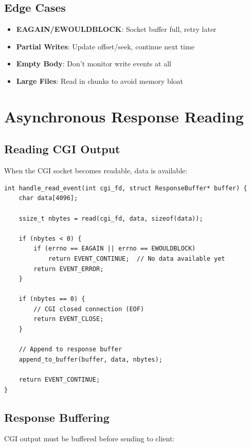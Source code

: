 \documentclass[12pt,a4paper]{article}
\begin{document}
\subsection{Edge Cases}

\begin{itemize}
    \item \textbf{EAGAIN/EWOULDBLOCK}: Socket buffer full, retry later
    \item \textbf{Partial Writes}: Update offset/seek, continue next time
    \item \textbf{Empty Body}: Don't monitor write events at all
    \item \textbf{Large Files}: Read in chunks to avoid memory bloat
\end{itemize}

\section{Asynchronous Response Reading}

\subsection{Reading CGI Output}

When the CGI socket becomes readable, data is available:

\begin{lstlisting}[caption=Non-Blocking Read]
int handle_read_event(int cgi_fd, struct ResponseBuffer* buffer) {
    char data[4096];
    
    ssize_t nbytes = read(cgi_fd, data, sizeof(data));
    
    if (nbytes < 0) {
        if (errno == EAGAIN || errno == EWOULDBLOCK)
            return EVENT_CONTINUE;  // No data available yet
        return EVENT_ERROR;
    }
    
    if (nbytes == 0) {
        // CGI closed connection (EOF)
        return EVENT_CLOSE;
    }
    
    // Append to response buffer
    append_to_buffer(buffer, data, nbytes);
    
    return EVENT_CONTINUE;
}
\end{lstlisting}

\subsection{Response Buffering}

CGI output must be buffered before sending to client:
\end{document}
